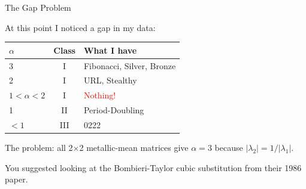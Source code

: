\documentclass[aspectratio=169, 11pt]{beamer}
\begin{document}
\begin{frame}{The Gap Problem}

At this point I noticed a gap in my data:

\vspace{0.3em}
\begin{center}
\begin{tabular}{lcl}
\toprule
$\alpha$ & Class & What I have \\
\midrule
3 & I & Fibonacci, Silver, Bronze \\
2 & I & URL, Stealthy \\
\rowcolor{yellow!30}
$1 < \alpha < 2$ & I & \textcolor{red}{Nothing!} \\
1 & II & Period-Doubling \\
$< 1$ & III & 0222 \\
\bottomrule
\end{tabular}
\end{center}

\vspace{0.5em}
The problem: all 2$\times$2 metallic-mean matrices give $\alpha = 3$ because $|\lambda_2| = 1/|\lambda_1|$.

\vspace{0.3em}
You suggested looking at the Bombieri-Taylor cubic substitution from their 1986 paper.
\end{frame}
\end{document}
